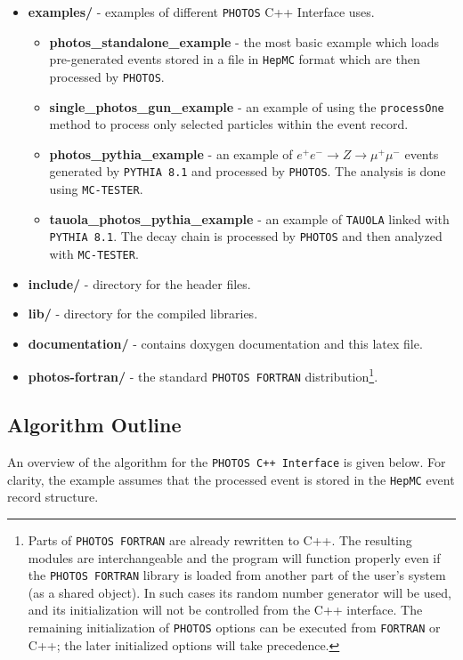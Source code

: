 \documentclass[]{Photos_interface_design}
\begin{document}
\begin{itemize}
  \item {\bf examples/ } - examples of different {\tt PHOTOS} C++ Interface uses.
    \begin{itemize}
	\item {\bf photos\_standalone\_example} - the most basic example which loads pre-generated 
	      events stored in a file in {\tt HepMC} format which are then processed by {\tt PHOTOS}.
	\item {\bf single\_photos\_gun\_example} - an example of using the {\tt processOne} method
	      to process only selected particles within the event record.
    \item {\bf photos\_pythia\_example} - an example of $e^+e^- \rightarrow Z \rightarrow \mu^+\mu^-$ events
	generated by {\tt PYTHIA 8.1} and processed by {\tt PHOTOS}. The analysis is done using {\tt MC-TESTER}.
    \item {\bf tauola\_photos\_pythia\_example } - an example of  {\tt TAUOLA} linked with {\tt PYTHIA 8.1}.
	The decay chain is processed by {\tt PHOTOS} and then analyzed with {\tt MC-TESTER}.
    \end{itemize}   
  \item {\bf include/} - directory for the header files.
  \item {\bf lib/ } - directory for the compiled  libraries. 
  \item {\bf documentation/ } - contains doxygen documentation and this latex file.
  \item {\bf photos-fortran/ } - the  standard {\tt PHOTOS FORTRAN} 
        distribution\footnote{Parts of {\tt PHOTOS FORTRAN} are already 
        rewritten to C++. The resulting modules are interchangeable and the program
will function properly even if the {\tt PHOTOS FORTRAN} library is loaded from another
part of the user's system (as a shared object). 
In such cases its random number generator will 
be used, and its initialization will not be controlled from the C++ interface.
The remaining  initialization of {\tt PHOTOS} options can be executed from 
{\tt FORTRAN} or C++; the later initialized options
will take precedence.}.
\end{itemize}

\subsection{Algorithm Outline}
\label{sect:Outline}

An overview of the algorithm for  the {\tt PHOTOS C++ Interface} is
given below. For clarity, the example assumes that the processed event
is stored in the {\tt HepMC} event record structure.
\end{document}
